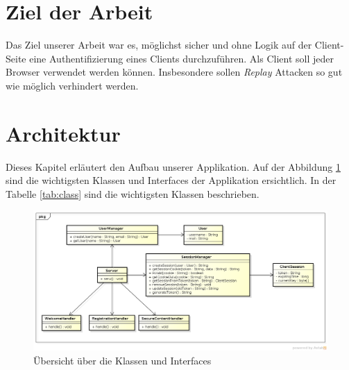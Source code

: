 \section{Ziel der Arbeit}

Das Ziel unserer Arbeit war es, möglichst sicher und ohne Logik auf der Client-Seite eine 
Authentifizierung eines Clients durchzuführen. Als Client soll jeder Browser verwendet werden können.
Insbesondere sollen \textit{Replay} Attacken so gut wie möglich verhindert werden.


\section{Architektur}

Dieses Kapitel erläutert den Aufbau unserer Applikation.
Auf der Abbildung \ref{fig:overview} sind die wichtigsten Klassen und Interfaces der Applikation ersichtlich. In der Tabelle \ref{tab:class} sind
die wichtigsten Klassen beschrieben.

\begin{figure}[ht]
	\begin{center}
		\includegraphics[width=1.0\textwidth]{./content/Class_Overview.png}
	\end{center}
	\caption{Übersicht über die Klassen und Interfaces}
	\label{fig:overview}
\end{figure}

